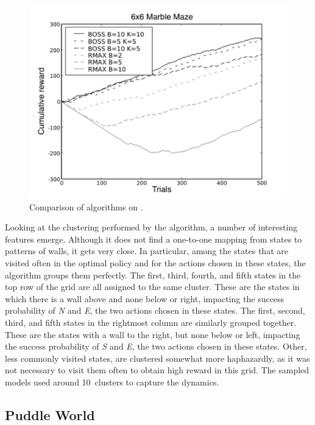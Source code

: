 \begin{figure}[t]
\begin{center}
\includegraphics[width=1.0\linewidth]{figures/marblemaze}
\caption{Comparison of algorithms on .}
\label{f:marblegraph}
\end{center}
\end{figure}

Looking at the clustering performed by the algorithm, a number of
interesting features emerge.  Although it does not find a one-to-one
mapping from states to patterns of walls, it gets very close.  In
particular, among the states that are visited often in the optimal
policy and for the actions chosen in these states, the algorithm
groups them perfectly.  The first, third, fourth, and fifth states in
the top row of the grid are all assigned to the same cluster.  These
are the states in which there is a wall above and none below or right,
impacting the success probability of \emph{N} and \emph{E}, the two actions
chosen in these states.  The first, second, third, and fifth states in
the rightmost column are similarly grouped together.  These are the
states with a wall to the right, but none below or left, impacting the
success probability of \emph{S} and \emph{E}, the two actions chosen in these
states.  Other, less commonly visited states, are clustered somewhat
more haphazardly,
as it was not necessary to visit them often to
obtain high reward in this grid.  The sampled models used around
10~clusters to capture the dynamics.

\subsection{Puddle World}
\label{puddle}

